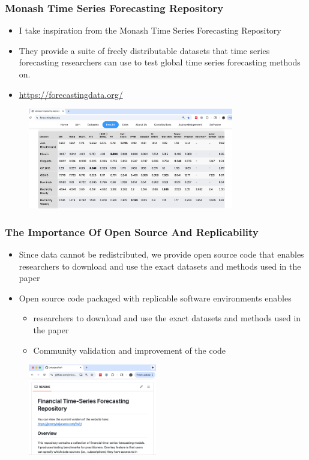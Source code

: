 \documentclass[ignorenonframetext, 9pt]{beamer}
\begin{document}
\begin{frame}
    \frametitle{Monash Time Series Forecasting Repository}
  \begin{itemize}
    \item I take inspiration from the Monash Time Series Forecasting Repository
    \item They provide a suite of freely distributable datasets that time series forecasting researchers can use to test global time series forecasting methods on. 
    \item \url{https://forecastingdata.org/}
    \end{itemize}
  \begin{figure}
      \centering
      \includegraphics[width=0.8\textwidth]{../docs_src/monash_website_table.png}
  \end{figure}
  \end{frame}

\begin{frame}
  \frametitle{The Importance Of Open Source And Replicability}
  \begin{itemize}
\item Since data cannot be redistributed, we provide open source code that enables researchers to download and use the exact datasets and methods used in the paper
  \item \alert{Open source code packaged with replicable software environments enables}
  \begin{itemize}
    \item researchers to download and use the exact datasets and methods used in the paper
    \item Community validation and improvement of the code
  \end{itemize}
  \end{itemize}
    \begin{figure}
    \centering
    \includegraphics[width=0.5\textwidth]{../docs_src/ftsfr_github.png}
    \end{figure}
\end{frame}
\end{document}
